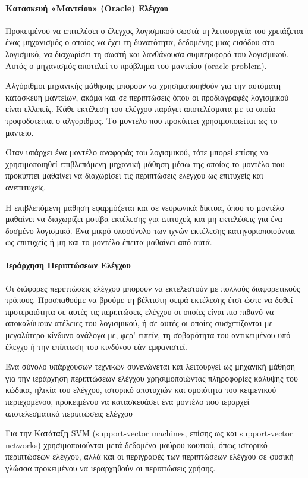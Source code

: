 \documentclass[12pt]{article}
\begin{document}
\paragraph{Κατασκευή «Μαντείου» (Oracle) Ελέγχου}
Προκειμένου να επιτελέσει ο έλεγχος λογισμικού σωστά τη λειτουργεία του χρειάζεται ένας μηχανισμός ο οποίος να έχει τη δυνατότητα, δεδομένης μιας εισόδου στο λογισμικό, να διαχωρίσει τη σωστή και λανθάνουσα συμπεριφορά του λογισμικού. Αυτός ο μηχανισμός αποτελεί το πρόβλημα του μαντείου (oracle problem).
\par Αλγόριθμοι μηχανικής μάθησης μπορούν να χρησιμοποιηθούν για την αυτόματη κατασκευή μαντείων, ακόμα και σε περιπτώσεις όπου οι προδιαγραφές λογισμικού είναι ελλιπείς. Κάθε εκτέλεση του ελέγχου παράγει αποτελέσματα με τα οποία τροφοδοτείται ο αλγόριθμος. Το μοντέλο που προκύπτει χρησιμοποιείται ως το μαντείο.
\par Όταν υπάρχει ένα μοντέλο αναφοράς του λογισμικού, τότε μπορεί επίσης να χρησιμοποιηθεί επιβλεπόμενη μηχανική μάθηση μέσω της οποίας το μοντέλο που προκύπτει μαθαίνει να διαχωρίσει τις περιπτώσεις ελέγχου ως επιτυχείς και ανεπιτυχείς.
\par Η επιβλεπόμενη μάθηση εφαρμόζεται και σε νευρωνικά δίκτυα, όπου το μοντέλο μαθαίνει να διαχωρίζει μοτίβα εκτέλεσης για επιτυχείς και μη εκτελέσεις για ένα δοσμένο λογισμικό. Ένα μικρό υποσύνολο των ιχνών εκτέλεσης κατηγοριοποιούνται ως επιτυχείς ή μη και το μοντέλο έπειτα μαθαίνει από αυτά.

\paragraph{Ιεράρχηση Περιπτώσεων Ελέγχου}
Οι διάφορες περιπτώσεις ελέγχου μπορούν να εκτελεστούν με πολλούς διαφορετικούς τρόπους. Προσπαθούμε να βρούμε τη βέλτιστη σειρά εκτέλεσης έτσι ώστε να δοθεί προτεραιότητα σε αυτές τις περιπτώσεις ελέγχου οι οποίες είναι πιο πιθανό να αποκαλύψουν ατέλειες του λογισμικού, ή σε αυτές οι οποίες συσχετίζονται με μεγαλύτερο κίνδυνο ανάλογα με, φερ’ ειπείν, τη σοβαρότητα του αντικειμένου υπό έλεγχο ή την επίπτωση του κινδύνου εάν εμφανιστεί.
\par Ένα σύνολο υπάρχουσων τεχνικών συνενώνεται και λειτουργεί ως μηχανική μάθηση για την ιεράρχηση περιπτώσεων ελέγχου χρησιμοποιώντας πληροφορίες κάλυψης του κώδικα, ηλικία του ελέγχου, ιστορικό αποτυχιών και ομοιότητα του κειμενικού περιεχομένου, προκειμένου να κατασκευάσει ένα μοντέλο που ιεραρχεί αποτελεσματικά περιπτώσεις ελέγχου
\par Για την Κατάταξη SVM (support-vector machines, επίσης ως και support-vector networks) χρησιμοποιούνται μετά-δεδομένα μαύρου κουτιού, όπως ιστορικό περιπτώσεων ελέγχου, αλλά και οι περιγραφές των περιπτώσεων ελέγχου σε φυσική γλώσσα προκειμένου να ιεραρχηθούν οι περιπτώσεις χρήσης.
\end{document}
